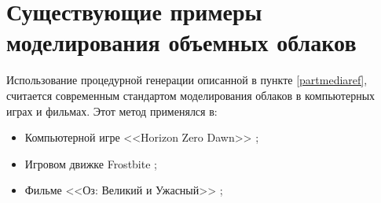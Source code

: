 \section{Существующие примеры моделирования объемных облаков}

Использование процедурной генерации описанной в пункте \ref{partmediaref}, считается современным стандартом моделирования облаков в компьютерных играх и фильмах. Этот метод применялся в:
\begin{itemize}
	\item Компьютерной игре <<Horizon Zero Dawn>> \cite{hzd};
	\item Игровом движке Frostbite \cite{frostbite};
	\item Фильме <<Оз: Великий и Ужасный>> \cite{oz};
\end{itemize}










